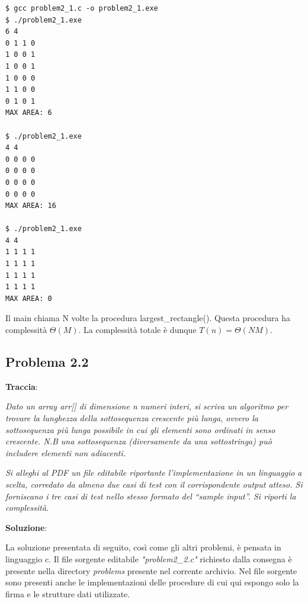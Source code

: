 \documentclass{article}
\begin{document}
\begin{commandline}
\begin{verbatim}
$ gcc problem2_1.c -o problem2_1.exe
$ ./problem2_1.exe 
6 4 
0 1 1 0
1 0 0 1
1 0 0 1
1 0 0 0
1 1 0 0 
0 1 0 1
MAX AREA: 6

$ ./problem2_1.exe 
4 4 
0 0 0 0
0 0 0 0
0 0 0 0
0 0 0 0
MAX AREA: 16

$ ./problem2_1.exe
4 4 
1 1 1 1 
1 1 1 1 
1 1 1 1 
1 1 1 1
MAX AREA: 0
\end{verbatim}
\end{commandline}

\noindent
Il main chiama N volte la procedura largest\_rectangle(). Questa procedura ha complessità $\Theta(M)$. La complessità totale è dunque $T(n) = \Theta(NM)$.


\subsection{Problema 2.2} \label{subsec:problema_2_2}
\textbf{Traccia}:

\noindent
\textit{Dato un array arr[] di dimensione n numeri interi, si scriva un algoritmo per trovare la lunghezza della sottosequenza crescente più lunga, ovvero la sottosequenza più lunga possibile in cui gli elementi sono ordinati in senso crescente. N.B una sottosequenza (diversamente da una sottostringa) può includere elementi non adiacenti.}

\noindent\textit{Si alleghi al PDF un file editabile riportante l'implementazione in un linguaggio a scelta, corredato da almeno due casi di test con il corrispondente output atteso. Si forniscano i tre casi di test nello stesso formato del “sample input”. Si riporti la complessità.}

\vspace{2\baselineskip}
\noindent
\textbf{Soluzione}: 

\noindent
La soluzione presentata di seguito, così come gli altri problemi, è pensata in linguaggio c. Il file sorgente editabile \textit{"problem2\_2.c"} richiesto dalla consegna è presente nella directory \textit{problems} presente nel corrente archivio. Nel file sorgente sono presenti anche le implementazioni delle procedure di cui qui espongo solo la firma e le strutture dati utilizzate.
\end{document}
